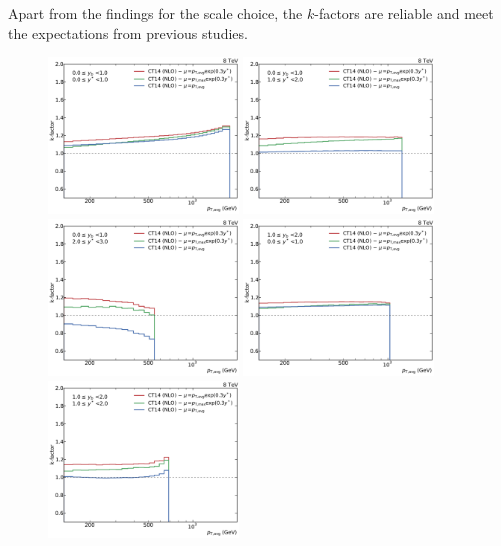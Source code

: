 Apart from the findings for the \ptavg scale choice, the $k$-factors are
reliable and meet the expectations from previous studies.

\begin{figure}[htp]
    \centering
    \includegraphics[width=0.45\textwidth]{figures/theory/kfactor_comp_yb0ys0.pdf}\hfill
    \includegraphics[width=0.45\textwidth]{figures/theory/kfactor_comp_yb0ys1.pdf}
    \includegraphics[width=0.45\textwidth]{figures/theory/kfactor_comp_yb0ys2.pdf}\hfill
    \includegraphics[width=0.45\textwidth]{figures/theory/kfactor_comp_yb1ys0.pdf}
    \includegraphics[width=0.45\textwidth]{figures/theory/kfactor_comp_yb1ys1.pdf}\hfill

\end{figure}

